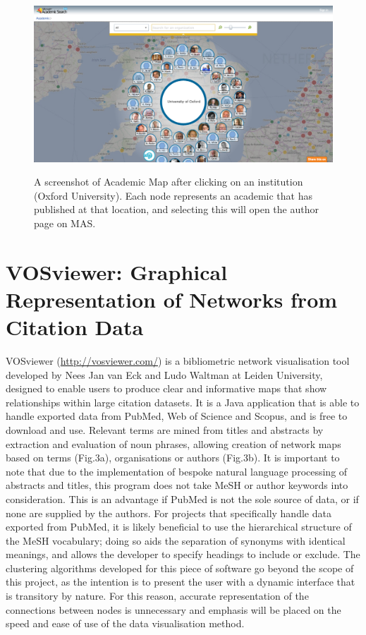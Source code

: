 \documentclass[PROP_AGutteridge_CS.tex]{subfiles}
\begin{document}
\begin{figure}
	\includegraphics[width=\textwidth]{../lib/images/AM}
	\label{fig:AM}
\caption{A screenshot of Academic Map after clicking on an institution (Oxford University). Each node represents an academic that has published at that location, and selecting this will open the author page on MAS.}
\end{figure}

\section{VOSviewer: Graphical Representation of Networks from Citation Data}
VOSviewer (\url{http://vosviewer.com/}) is a bibliometric network visualisation tool developed by Nees Jan van Eck and Ludo Waltman at Leiden University, designed to enable users to produce clear and informative maps that show relationships within large citation datasets\cite{eck-waltman2}. It is a Java application that is able to handle exported data from PubMed, Web of Science and Scopus, and is free to download and use. Relevant terms are mined from titles and abstracts by extraction and evaluation of noun phrases\cite{eck-waltman1}, allowing creation of network maps based on terms (Fig.3a), organisations or authors (Fig.3b). It is important to note that due to the implementation of bespoke natural language processing of abstracts and titles, this program does not take MeSH or author keywords into consideration. This is an advantage if PubMed is not the sole source of data, or if none are supplied by the authors. For projects that specifically handle data exported from PubMed, it is likely beneficial to use the hierarchical structure of the MeSH vocabulary; doing so aids the separation of synonyms with identical meanings, and allows the developer to specify headings to include or exclude. The clustering algorithms developed for this piece of software go beyond the scope of this project, as the intention is to present the user with a dynamic interface that is transitory by nature. For this reason, accurate representation of the connections between nodes is unnecessary and emphasis will be placed on the speed and ease of use of the data visualisation method.
\end{document}
